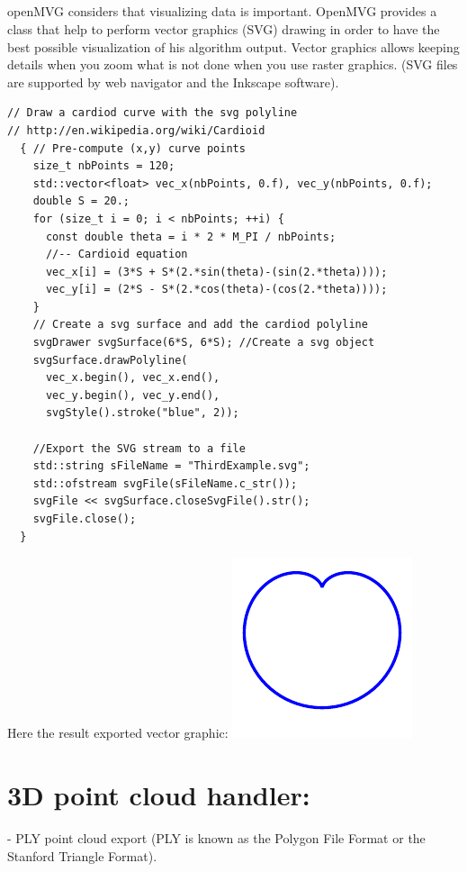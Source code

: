 \documentclass[11pt, letterpaper]{report}
\begin{document}
\paragraph{}
openMVG considers that visualizing data is important. OpenMVG provides a class that help to perform vector graphics (SVG) drawing in order to have the best possible visualization of his algorithm output. Vector graphics allows keeping details when you zoom what is not done when you use raster graphics. (SVG files are supported by web navigator and the Inkscape software).

\vspace{-.5cm}
\begin{lstlisting}
// Draw a cardiod curve with the svg polyline
// http://en.wikipedia.org/wiki/Cardioid
  { // Pre-compute (x,y) curve points
    size_t nbPoints = 120;
    std::vector<float> vec_x(nbPoints, 0.f), vec_y(nbPoints, 0.f);
    double S = 20.;
    for (size_t i = 0; i < nbPoints; ++i) {
      const double theta = i * 2 * M_PI / nbPoints;
      //-- Cardioid equation
      vec_x[i] = (3*S + S*(2.*sin(theta)-(sin(2.*theta))));
      vec_y[i] = (2*S - S*(2.*cos(theta)-(cos(2.*theta))));
    }
    // Create a svg surface and add the cardiod polyline
    svgDrawer svgSurface(6*S, 6*S); //Create a svg object
    svgSurface.drawPolyline(
      vec_x.begin(), vec_x.end(),
      vec_y.begin(), vec_y.end(),
      svgStyle().stroke("blue", 2));

    //Export the SVG stream to a file
    std::string sFileName = "ThirdExample.svg";
    std::ofstream svgFile(sFileName.c_str());
    svgFile << svgSurface.closeSvgFile().str();
    svgFile.close();
  }
\end{lstlisting}
Here the result exported vector graphic:
\includegraphics[scale=1]{figures/vectorGraphics/ThirdExample}
  
\newpage
\chapter{3D point cloud handler:}
- PLY point cloud export (PLY is known as the Polygon File Format or the Stanford Triangle Format).\newline
\end{document}
